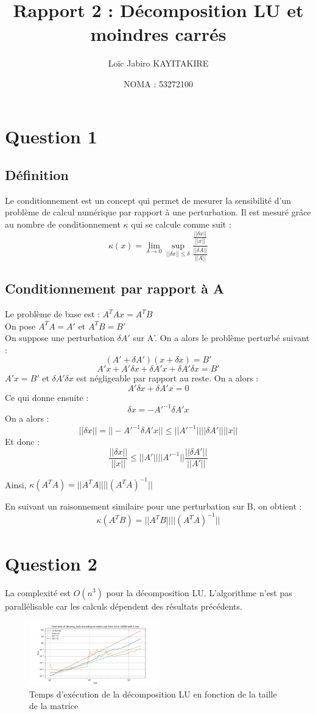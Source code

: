 \documentclass[11pt]{article}
\title{Rapport 2 : Décomposition LU et moindres carrés}
\author{Loïc Jabiro KAYITAKIRE}
\date{NOMA : 53272100}
\begin{document}
\maketitle

\section*{Question 1}

\subsection*{Définition}
Le conditionnement est un concept qui permet de mesurer la sensibilité d'un problème de calcul numérique par rapport à une perturbation. 
Il est mesuré grâce au nombre de conditionnement $ \kappa $ qui se calcule comme suit :
$$ \kappa(x) = \lim_{\delta \to 0}   \sup_{||\delta x|| \leq \delta}   \frac{\frac{||\delta x||}{||x||}}{\frac{||\delta A||}{||A||}} $$

\subsection*{Conditionnement par rapport à A}

Le problème de base est : $A^T A x = A^T B$
\\
On pose $A^T A = A'$ et $A^T B = B'$
\\
On suppose une perturbation $ \delta A' $ sur A'. On a alors le problème perturbé suivant : 
$$ (A' + \delta A') (x + \delta x) = B' $$
$$ A'x + A'\delta x + \delta A'x + \delta A' \delta x = B' $$
$ A'x = B'$ et $ \delta A' \delta x$ est négligeable par rapport au reste. On a alors :
$$ A'\delta x + \delta A' x = 0 $$
Ce qui donne ensuite :
$$ \delta x = -A'^{-1} \delta A' x $$
On a alors :
$$ ||\delta x|| = ||-A'^{-1} \delta A' x|| \leq ||A'^{-1}|| ||\delta A'|| ||x|| $$
Et donc :
$$ \frac{||\delta x||}{||x||} \leq ||A'||||A'^{-1}|| \frac{||\delta A'||}{||A'||} $$

Ainsi, $ \kappa(A^T A) = ||A^T A||||(A^T A)^{-1}|| $ 

En suivant un raisonnement similaire pour une perturbation sur B, on obtient :
$$ \kappa(A^T B) = ||A^T B||||(A^T A)^{-1}|| $$

\section*{Question 2}

La complexité est $O(n^3)$ pour la décomposition LU. L'algorithme n'est pas parallélisable car les calculs dépendent des résultats précédents.
\begin{figure}[h]
\centering
\includegraphics[width=0.5\textwidth]{images/lu_time_tests.pdf}
\caption{Temps d'exécution de la décomposition LU en fonction de la taille de la matrice}
\end{figure}
\end{document}
